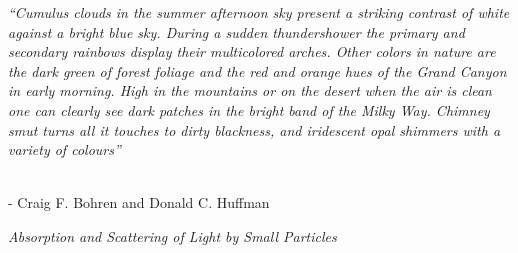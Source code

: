 \thispagestyle{empty}
\vspace*{\fill}

\begin{flushright}
\large {\em ``Cumulus clouds in the summer afternoon sky present a striking contrast of white against a bright blue sky.  During a sudden thundershower the primary and secondary rainbows display their multicolored arches.  Other colors in nature are the dark green of forest foliage and the red and orange hues of the Grand Canyon in early morning.  High in the mountains or on the desert when the air is clean one can clearly see dark patches in the bright band of the Milky Way.  Chimney smut turns all it touches to dirty blackness, and iridescent opal shimmers with a variety of colours''} 
\\

\ \

\normalsize
{- Craig F. Bohren and Donald C. Huffman

{\em Absorption and Scattering of Light by Small Particles}}
\end{flushright}




\vspace*{\fill}

\vspace*{\fill}

\vspace*{\fill}


